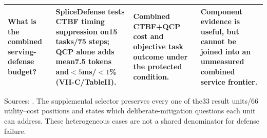 \begin{table}[t]
\begin{tabularx}{\textwidth}{@{}p{}p{}YY@{}}
What is the combined serving-defense budget? & SpliceDefense tests CTBF timing suppression on15 tasks/75 steps; QCP alone adds mean7.5 tokens and$<5$ms/$<1$\% (VII-C/TableII). & Combined CTBF+QCP cost and objective task outcome under the protected condition. & Component evidence is useful, but cannot be joined into an unmeasured combined service frontier.\\\bottomrule
\end{tabularx}
\par\smallskip\raggedright\footnotesize
Sources: \cite{jeong2026wra,netecho2025,dangol2026workflow,zhu2026turing,earlybird2025,addagada2026kvgov,spliceleak2026}.
The supplemental selector preserves every one of the33 result units/66 utility--cost positions and states which deliberate-mitigation questions each unit can address. These heterogeneous cases are not a shared denominator for defense failure.
\end{table}
